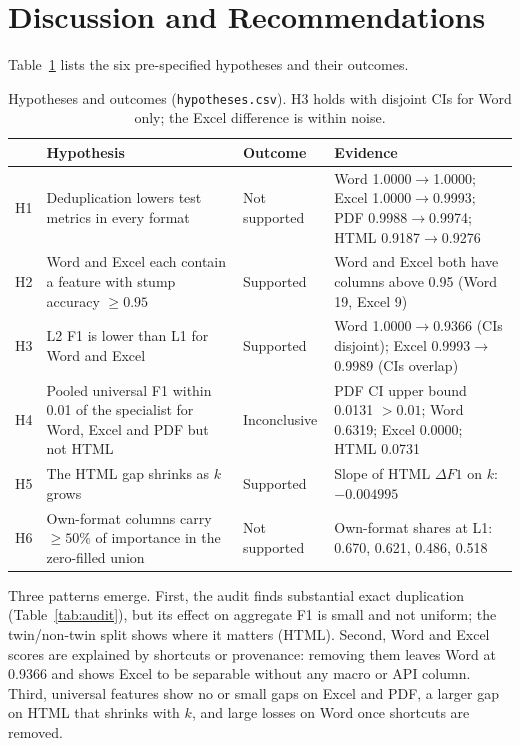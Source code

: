 \documentclass[conference]{IEEEtran}
\begin{document}
\section{Discussion and Recommendations}
Table~\ref{tab:hyp} lists the six pre-specified hypotheses and their outcomes.

\begin{table}[t]
\centering\footnotesize
\caption{Hypotheses and outcomes (\texttt{hypotheses.csv}). H3 holds with disjoint CIs for Word only; the Excel difference is within noise.}
\label{tab:hyp}
\begin{tabular}{lp{5.2cm}lp{6.0cm}}
\toprule
 & Hypothesis & Outcome & Evidence \\
\midrule
H1 & Deduplication lowers test metrics in every format & Not supported & Word 1.0000$\to$1.0000; Excel 1.0000$\to$0.9993; PDF 0.9988$\to$0.9974; HTML 0.9187$\to$0.9276 \\
H2 & Word and Excel each contain a feature with stump accuracy $\ge0.95$ & Supported & Word and Excel both have columns above 0.95 (Word 19, Excel 9) \\
H3 & L2 F1 is lower than L1 for Word and Excel & Supported & Word 1.0000$\to$0.9366 (CIs disjoint); Excel 0.9993$\to$0.9989 (CIs overlap) \\
H4 & Pooled universal F1 within 0.01 of the specialist for Word, Excel and PDF but not HTML & Inconclusive & PDF CI upper bound 0.0131 $>0.01$; Word 0.6319; Excel 0.0000; HTML 0.0731 \\
H5 & The HTML gap shrinks as $k$ grows & Supported & Slope of HTML $\Delta F1$ on $k$: $-0.004995$ \\
H6 & Own-format columns carry $\ge50\%$ of importance in the zero-filled union & Not supported & Own-format shares at L1: 0.670, 0.621, 0.486, 0.518 \\
\bottomrule
\end{tabular}
\end{table}

Three patterns emerge. First, the audit finds substantial exact duplication (Table~\ref{tab:audit}), but its effect on aggregate F1 is small and not uniform; the twin/non-twin split shows where it matters (HTML). Second, Word and Excel scores are explained by shortcuts or provenance: removing them leaves Word at 0.9366 and shows Excel to be separable without any macro or API column. Third, universal features show no or small gaps on Excel and PDF, a larger gap on HTML that shrinks with $k$, and large losses on Word once shortcuts are removed.
\end{document}
